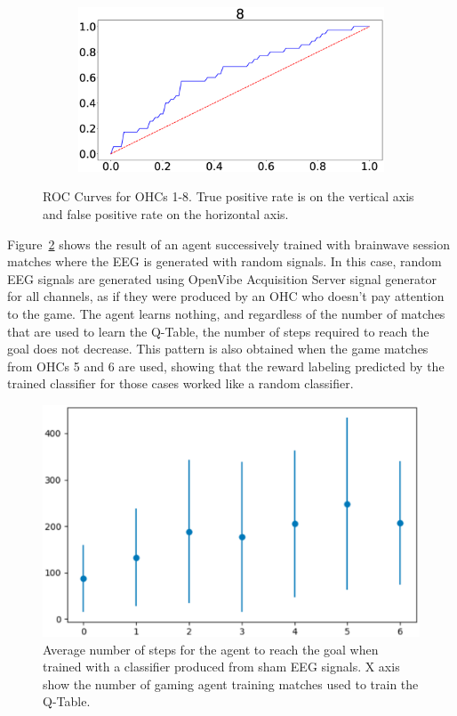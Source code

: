 \documentclass[journal]{IEEEtran}
\begin{document}
{{\begin{figure}[h!]
\begin{subfigure}{0.5\textwidth}
  \includegraphics[scale=0.09]{revisedimages/roc_8.eps} \\
\end{subfigure}
\caption{ROC Curves for OHCs 1-8. True positive rate is on the vertical axis and false positive rate on the horizontal axis.}
\label{fig:rocsubjects}
\end{figure}


Figure~\ref{fig:avg_steps_noise} shows the result of an agent successively trained with brainwave session matches where the EEG is generated with random signals.  In this case, random EEG signals are generated using OpenVibe Acquisition Server signal generator for all channels, as if they were produced by an OHC who doesn't pay attention to the game.  The agent learns nothing, and regardless of the number of matches that are used to learn the Q-Table, the number of steps required to reach the goal does not decrease.  This pattern is also obtained when the game matches from OHCs 5 and 6 are used, showing that the reward labeling predicted by the trained classifier for those cases worked like a random classifier.

\begin{figure}[h!]
\centering
\includegraphics[scale=0.4]{Images/Average_steps/noise.eps}
\caption{Average number of steps for the agent to reach the goal when trained with a classifier produced from sham EEG signals. X axis show the number of gaming agent training matches used to train the Q-Table.}
\label{fig:avg_steps_noise}
\end{figure}

}}
\end{document}
